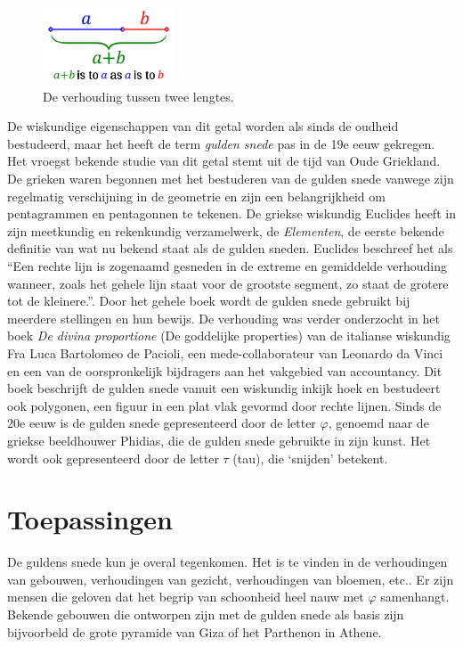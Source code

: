 \documentclass{article}
\begin{document}
\begin{figure}[Hh]
	\centering
	\includegraphics[width=0.35\textwidth]{golden-ratio-line.png}
	\caption{De verhouding tussen twee lengtes.}
	\label{fig:ratio-lines}
\end{figure}

De wiskundige eigenschappen van dit getal worden als sinds de oudheid bestudeerd, maar het heeft de term \textit{gulden snede} pas in de 19e eeuw gekregen. Het vroegst bekende studie van dit getal stemt uit de tijd van Oude Griekland. De grieken waren begonnen met het bestuderen van de gulden snede vanwege zijn regelmatig verschijning in de geometrie en zijn een belangrijkheid om pentagrammen en pentagonnen te tekenen. De griekse wiskundig Euclides heeft in zijn meetkundig en rekenkundig verzamelwerk, de \textit{Elementen}, de eerste bekende definitie van wat nu bekend staat als de gulden sneden. Euclides beschreef het als ``Een rechte lijn is zogenaamd gesneden in de extreme en gemiddelde verhouding wanneer, zoals het gehele lijn staat voor de grootste segment, zo staat de grotere tot de kleinere.''. Door het gehele boek wordt de gulden snede gebruikt bij meerdere stellingen en hun bewijs. De verhouding was verder onderzocht in het boek \textit{De divina proportione} (De goddelijke properties) van de italianse wiskundig Fra Luca Bartolomeo de Pacioli, een mede-collaborateur van Leonardo da Vinci en een van de oorspronkelijk bijdragers aan het vakgebied van accountancy. Dit boek beschrijft de gulden snede vanuit een wiskundig inkijk hoek en bestudeert ook polygonen, een figuur in een plat vlak gevormd door rechte lijnen. Sinds de 20e eeuw is de gulden snede gepresenteerd door de letter \(\varphi\), genoemd naar de griekse beeldhouwer Phidias, die de gulden snede gebruikte in zijn kunst. Het wordt ook gepresenteerd door de letter \(\tau\) (tau), die `snijden' betekent.

\section{Toepassingen}

De guldens snede kun je overal tegenkomen. Het is te vinden in de verhoudingen van gebouwen, verhoudingen van gezicht, verhoudingen van bloemen, etc.. Er zijn mensen die geloven dat het begrip van schoonheid heel nauw met \(\varphi\) samenhangt. Bekende gebouwen die ontworpen zijn met de gulden snede als basis zijn bijvoorbeld de grote pyramide van Giza of het Parthenon in Athene. 
\end{document}
